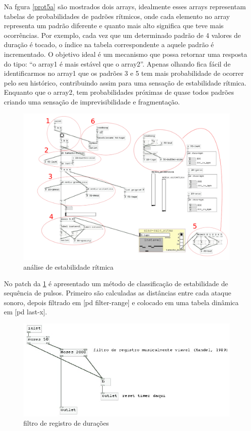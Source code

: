 \documentclass{ppgmus}
\begin{document}
Na fgura \ref{prot5a} são mostrados dois arrays, idealmente esses arrays representam tabelas
de probabilidades de padrões rítmicos, onde cada elemento no array representa um
padrão diferente e quanto mais alto significa que teve mais ocorrências.
Por exemplo, cada vez que um determinado padrão de 4 valores de duração é tocado, 
o índice na tabela correspondente a aquele padrão é incrementado. O objetivo ideal
é um mecanismo que possa retornar uma resposta do tipo:
``o array1 é mais estável que o array2''. Apenas olhando fica fácil de identificarmos
no array1 que os padrões 3 e 5 tem mais probabilidade de ocorrer pelo seu histórico,
contribuindo assim para uma sensação de estabilidade rítmica. Enquanto que o array2,
tem probabilidades próximas de quase todos padrões criando uma sensação de imprevisibilidade
e fragmentação.


\begin{figure}
\includegraphics[scale=.5]{sinc-calc-ritmo}
\caption{análise de estabilidade rítmica}
\label{[sinc-calc-ritmo]}
\end{figure}

No patch da \ref{[sinc-calc-ritmo]} é apresentado um método de classificação de estabilidade
de sequência de pulsos. Primeiro são calculadas as distâncias entre cada ataque
sonoro, depois filtrado em [pd filter-range] e colocado em uma tabela dinâmica em
[pd last-x]. 


\begin{figure}
\includegraphics[scale=.6]{sinc-calc-ritmo1}
\caption{filtro de registro de durações}
\label{[sinc-calc-ritmo1]}
\end{figure}
\end{document}
